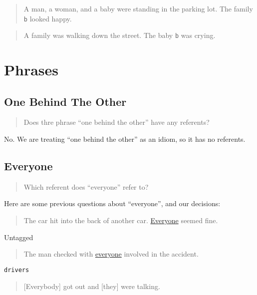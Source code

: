 \documentclass[
]{book}
\begin{document}
\begin{quote}
A man, a woman, and a baby were standing in the parking lot.
The family \texttt{b} looked happy.
\end{quote}

\begin{quote}
A family was walking down the street.
The baby \texttt{b} was crying.
\end{quote}

\hypertarget{phrases}{%
\section{Phrases}\label{phrases}}

\hypertarget{one-behind-the-other}{%
\subsection{One Behind The Other}\label{one-behind-the-other}}

\begin{quote}
Does thre phrase ``one behind the other'' have any referents?
\end{quote}

No.
We are treating ``one behind the other'' as an idiom, so it has no referents.

\hypertarget{everyone}{%
\subsection{Everyone}\label{everyone}}

\begin{quote}
Which referent does ``everyone'' refer to?
\end{quote}

Here are some previous questions about ``everyone'', and our decisions:

\begin{quote}
The car hit into the back of another car.
\protect\hyperlink{everyone}{Everyone} seemed fine.
\end{quote}

Untagged

\begin{quote}
The man checked with \protect\hyperlink{everyone}{everyone} involved in the accident.
\end{quote}

\texttt{drivers}

\begin{quote}
{[}Everybody{]} got out and {[}they{]} were talking.
\end{quote}
\end{document}

